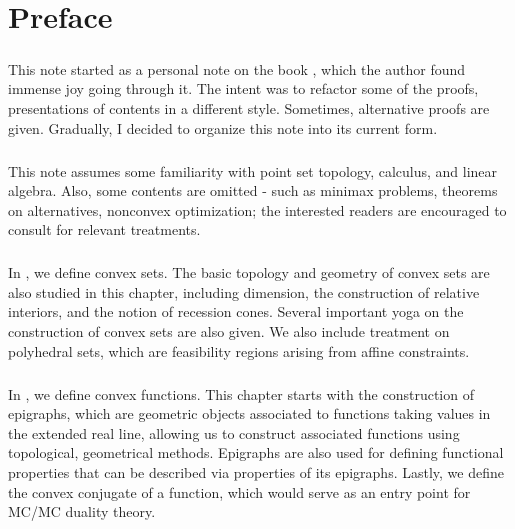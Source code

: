 \chapter*{Preface}

\paragraph{}This note started as a personal note on the book \cite{bertsekas2009convex}, which the author found immense joy going through it. The intent was to refactor some of the proofs, presentations of contents in a different style. Sometimes, alternative proofs are given. Gradually, I decided to organize this note into its current form.

\paragraph{}This note assumes some familiarity with point set topology, calculus, and linear algebra. Also, some contents are omitted - such as minimax problems, theorems on alternatives, nonconvex optimization; the interested readers are encouraged to consult \cite{bertsekas2009convex} for relevant treatments.

\paragraph{}In , we define convex sets. The basic topology and geometry of convex sets are also studied in this chapter, including dimension, the construction of relative interiors, and the notion of recession cones. Several important yoga on the construction of convex sets are also given. We also include treatment on polyhedral sets, which are feasibility regions arising from affine constraints.

\paragraph{}In , we define convex functions. This chapter starts with the construction of epigraphs, which are geometric objects associated to functions taking values in the extended real line, allowing us to construct associated functions using topological, geometrical methods. Epigraphs are also used for defining functional properties that can be described via properties of its epigraphs. Lastly, we define the convex conjugate of a function, which would serve as an entry point for MC/MC duality theory.

